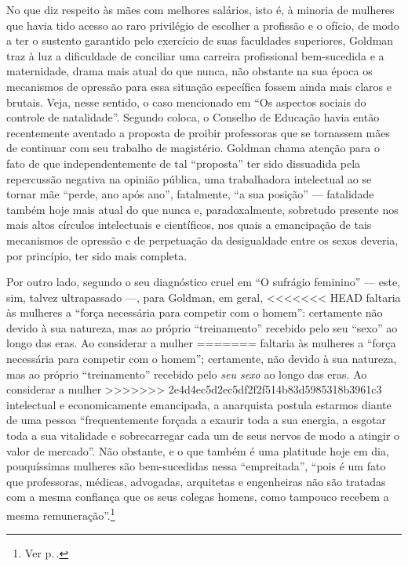 No que diz respeito às mães com melhores salários, isto é, à minoria de
mulheres que havia tido acesso ao raro privilégio de escolher a
profissão e o ofício, de modo a ter o sustento garantido pelo exercício
de suas faculdades superiores, Goldman traz à luz a dificuldade de
conciliar uma carreira profissional bem-sucedida e a maternidade, drama
mais atual do que nunca, não obstante na sua época os mecanismos de
opressão para essa situação específica fossem ainda mais claros e
brutais. Veja, nesse sentido, o caso mencionado em ``Os aspectos
sociais do controle de natalidade''. Segundo coloca, o Conselho de
Educação havia então recentemente aventado a proposta de proibir
professoras que se tornassem mães de continuar com seu trabalho de
magistério. Goldman chama atenção para o fato de que independentemente
de tal ``proposta'' ter sido dissuadida pela repercussão negativa na
opinião pública, uma trabalhadora intelectual ao se tornar mãe ``perde,
ano após ano'', fatalmente, ``a sua posição'' --- fatalidade também hoje
mais atual do que nunca e, paradoxalmente, sobretudo presente nos mais
altos círculos intelectuais e científicos, nos quais a emancipação de
tais mecanismos de opressão e de perpetuação da desigualdade entre os
sexos deveria, por princípio, ter sido mais completa.

Por outro lado, segundo o seu diagnóstico cruel em ``O sufrágio
feminino'' --- este, sim, talvez ultrapassado ---, para Goldman, em geral,
<<<<<<< HEAD
faltaria às mulheres a ``força necessária para competir com o homem'':
certamente não devido à sua natureza, mas ao próprio ``treinamento''
recebido pelo seu ``sexo'' ao longo das eras. Ao considerar a mulher
=======
faltaria às mulheres a ``força necessária para competir com o homem'';
certamente, não devido à sua natureza, mas ao próprio ``treinamento''
recebido pelo \textit{seu sexo} ao longo das eras. Ao considerar a mulher
>>>>>>> 2e4d4ec5d2ec5df2f2f514b83d5985318b3961c3
intelectual e economicamente emancipada, a anarquista postula estarmos
diante de uma pessoa ``frequentemente forçada a exaurir toda a sua
energia, a esgotar toda a sua vitalidade e sobrecarregar cada um de seus
nervos de modo a atingir o valor de mercado''. Não obstante, e o que
também é uma platitude hoje em dia, pouquíssimas mulheres são
bem-sucedidas nessa ``empreitada'', ``pois é um fato que
professoras, médicas, advogadas, arquitetas e engenheiras não são
tratadas com a mesma confiança que os seus colegas homens, como tampouco
recebem a mesma remuneração''.\footnote{Ver p.\,\pageref{igualdade}.}


